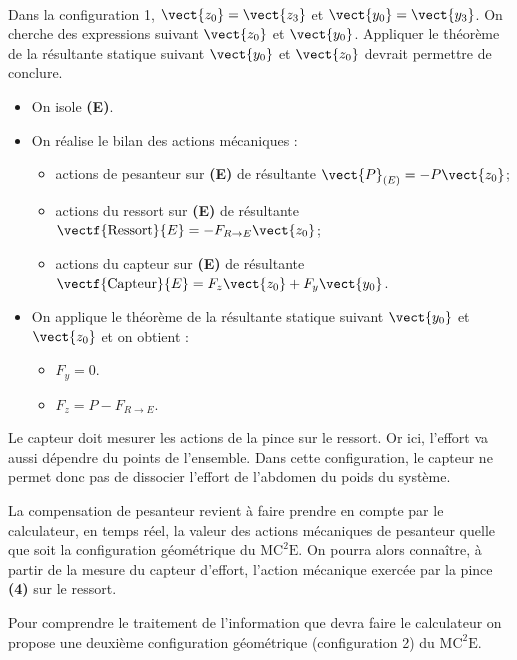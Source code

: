 \begin{multicols}{2}
\ifprof
\begin{corrige}~\\

\begin{methode}
Dans la configuration 1, $\vect{z_0}=\vect{z_3}$ et $\vect{y_0}=\vect{y_3}$. On cherche des expressions suivant $\vect{z_0}$ et $\vect{y_0}$. Appliquer le théorème de la résultante statique suivant $\vect{y_0}$ et $\vect{z_0}$ devrait permettre de conclure. 
\end{methode}
\begin{itemize}
\item On isole \textbf{(E)}.
\item On réalise le bilan des actions mécaniques : 
\begin{itemize}
\item actions de pesanteur sur \textbf{(E)} de résultante $\vect{P}_{(E)}=-P\vect{z_0}$;
\item actions du ressort sur \textbf{(E)} de résultante $\vectf{\text{Ressort}}{E}=-F_{R\to E} \vect{z_0}$;
\item actions du capteur sur \textbf{(E)} de résultante $\vectf{\text{Capteur}}{E}=F_z\vect{z_0}+F_y\vect{y_0}$.
\end{itemize}
\item On applique le théorème de la résultante statique suivant $\vect{y_0}$ et $\vect{z_0}$ et on obtient : 
\begin{itemize}
\item $F_y = 0$. 
\item $F_z = P- F_{R\to E}$. 
\end{itemize}
\end{itemize}
Le capteur doit mesurer les actions de la pince sur le ressort. Or ici, l'effort va aussi dépendre du points de l’ensemble. Dans cette configuration, le capteur ne permet donc pas de dissocier l'effort de l'abdomen du poids du système.
\end{corrige}
\else
\fi

\ifprof
\else
La compensation de pesanteur revient à faire prendre en compte par le calculateur, en temps réel, la valeur des actions mécaniques de pesanteur quelle que soit la configuration géométrique du $\text{MC}^2\text{E}$. On pourra alors connaître, à partir de la mesure du capteur d’effort, l’action mécanique exercée par la pince \textbf{(4)} sur le ressort.

Pour comprendre le traitement de l’information que devra faire le calculateur on propose une deuxième configuration géométrique (configuration 2) du $\text{MC}^2\text{E}$.


\end{multicols}
